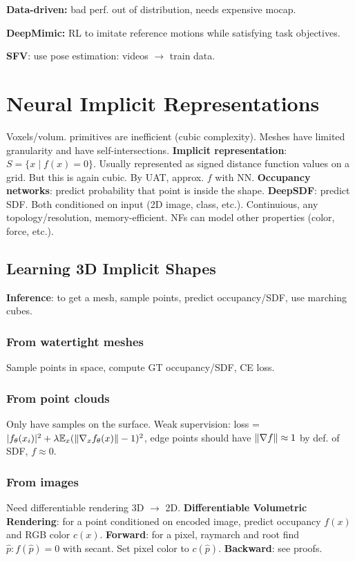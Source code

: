 \documentclass[11pt,landscape,a4paper,fleqn]{article}
\newcommand{\E}{\mathbb{E}}
\begin{document}
\begin{multicols*}{4}
\textbf{Data-driven:}
bad perf. out of distribution,
needs expensive mocap.

\textbf{DeepMimic:} RL to imitate reference motions while satisfying task objectives.

\textbf{SFV}: use pose estimation: videos $\to$ train data.

\section{Neural Implicit Representations}

Voxels/volum. primitives are inefficient (cubic complexity).
Meshes have limited granularity and have self-intersections.
\textbf{Implicit representation}: $S = \{x \mid f(x) = 0\}$.
Usually represented as signed distance function values on a grid.
But this is again cubic.
By UAT, approx. $f$ with NN.
\textbf{Occupancy networks}: predict probability that point is inside the shape.
\textbf{DeepSDF}: predict SDF.
Both conditioned on input (2D image, class, etc.).
Continuious, any topology/resolution, memory-efficient.
NFs can model other properties (color, force, etc.).

\subsection{Learning 3D Implicit Shapes}

\textbf{Inference}: to get a mesh, sample points, predict occupancy/SDF, use marching cubes.

\subsubsection{From watertight meshes}
Sample points in space, compute GT occupancy/SDF, CE loss.

\subsubsection{From point clouds} Only have samples on the surface.
Weak supervision: loss = $|f_\theta(x_i)|^2 + \lambda \E_x(\norm{\nabla_x f_\theta(x)} - 1)^2$,
edge points should have $\norm{\nabla f} \approx 1$ by def. of SDF, $f \approx 0$.

\subsubsection{From images} Need differentiable rendering 3D $\to$ 2D.
\textbf{Differentiable Volumetric Rendering}: for a point conditioned on encoded image,
predict occupancy $f(x)$ and RGB color $c(x)$.
\textbf{Forward}: for a pixel, raymarch and root find $\hat{p} : f(\hat{p}) = 0$ with secant. Set pixel color to $c(\hat{p})$.
\textbf{Backward}: see proofs.


\end{multicols*}
\end{document}
